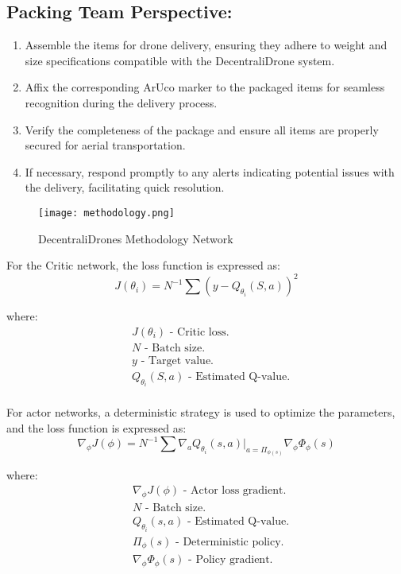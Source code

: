\documentclass[preprint,12pt]{elsarticle}
\begin{document}
\subsection{Packing Team Perspective:}
\begin{enumerate}
\item Assemble the items for drone delivery, ensuring they adhere to weight and size specifications compatible with the DecentraliDrone system.
\item Affix the corresponding ArUco marker to the packaged items for seamless recognition during the delivery process.
\item Verify the completeness of the package and ensure all items are properly secured for aerial transportation.
\item If necessary, respond promptly to any alerts indicating potential issues with the delivery, facilitating quick resolution.
\end{enumerate}

\begin{figure}[!htbp]
    \centering
    \texttt{[image: methodology.png]}
    \caption{DecentraliDrones Methodology Network}
\end{figure}

For the Critic network, the loss function is expressed as:
\begin{equation}
\label{eq:first}
J(\theta_i) = N^{-1}\sum(y - Q_{\theta_i}(S,a))^2
\end{equation}

where:\\
\begin{align*}
&J(\theta_i) \text{ - Critic loss.} \\
&N \text{ - Batch size.} \\
&y \text{ - Target value.} \\
&Q_{\theta_i}(S,a) \text{ - Estimated Q-value.} \\
\end{align*}

For actor networks, a deterministic strategy is used to optimize the parameters, and the loss function is expressed as:
\begin{equation}
\label{eq:second}
{\nabla_\phi}{J(\phi)}=N^{-1}\sum\nabla_{a}Q_{\theta_i}(s,a)|_{a=\Pi_{\phi(s)}}\nabla_{\phi}\Phi_\phi(s)
\end{equation}

where:\\
\begin{align*}
&\nabla_\phi J(\phi) \text{ - Actor loss gradient.} \\
&N \text{ - Batch size.} \\
&Q_{\theta_i}(s,a) \text{ - Estimated Q-value.} \\
&\Pi_\phi(s) \text{ - Deterministic policy.} \\
&\nabla_\phi\Phi_\phi(s) \text{ - Policy gradient.} \\
\end{align*}
\end{document}
